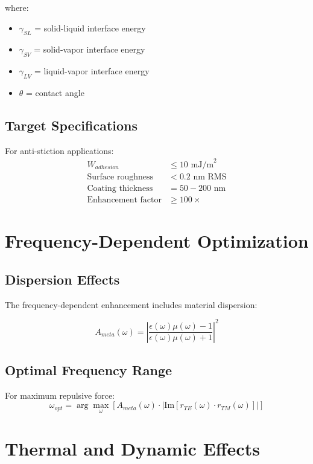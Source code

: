\documentclass{article}
\begin{document}
where:
\begin{itemize}
\item $\gamma_{SL}$ = solid-liquid interface energy
\item $\gamma_{SV}$ = solid-vapor interface energy  
\item $\gamma_{LV}$ = liquid-vapor interface energy
\item $\theta$ = contact angle
\end{itemize}

\subsection{Target Specifications}

For anti-stiction applications:
\begin{align}
W_{adhesion} &\leq 10 \text{ mJ/m}^2\\
\text{Surface roughness} &< 0.2 \text{ nm RMS}\\
\text{Coating thickness} &= 50-200 \text{ nm}\\
\text{Enhancement factor} &\geq 100\times
\end{align}

\section{Frequency-Dependent Optimization}

\subsection{Dispersion Effects}

The frequency-dependent enhancement includes material dispersion:

\begin{equation}
A_{meta}(\omega) = \left|\frac{\epsilon(\omega)\mu(\omega)-1}{\epsilon(\omega)\mu(\omega)+1}\right|^2
\end{equation}

\subsection{Optimal Frequency Range}

For maximum repulsive force:
\begin{equation}
\omega_{opt} = \arg\max_\omega \left[ A_{meta}(\omega) \cdot |\text{Im}[r_{TE}(\omega) \cdot r_{TM}(\omega)]| \right]
\end{equation}

\section{Thermal and Dynamic Effects}
\end{document}
